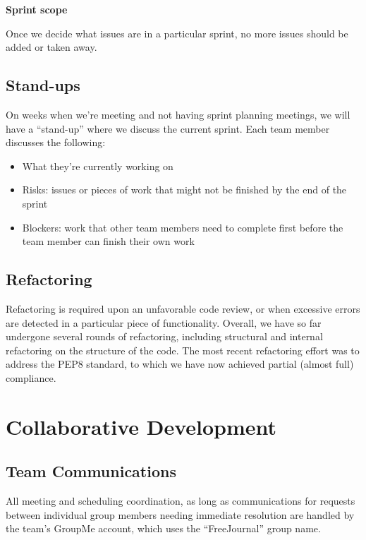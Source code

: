 \documentclass[letterpaper,10pt,oneside]{sphinxmanual}
\begin{document}
\textbf{Sprint scope}

Once we decide what issues are in a particular sprint, no more issues should be added or taken away.


\subsection{Stand-ups}
\label{process:stand-ups}
On weeks when we're meeting and not having sprint planning meetings, we will have a ``stand-up'' where we
discuss the current sprint. Each team member discusses the following:
\begin{itemize}
\item {} 
What they're currently working on

\item {} 
Risks: issues or pieces of work that might not be finished by the end of the sprint

\item {} 
Blockers: work that other team members need to complete first before the team member can finish their own work

\end{itemize}


\subsection{Refactoring}
\label{process:refactoring}
Refactoring is required upon an unfavorable code review, or when excessive errors are detected in a particular
piece of functionality.  Overall, we have so far undergone several rounds of refactoring, including structural
and internal refactoring on the structure of the code.  The most recent refactoring effort was to address the
PEP8 standard, to which we have now achieved partial (almost full) compliance.


\section{Collaborative Development}
\label{process:collaborative-development}

\subsection{Team Communications}
\label{process:team-communications}
All meeting and scheduling coordination, as long as communications for requests between individual group members
needing immediate resolution are handled by the team's GroupMe account, which uses the ``FreeJournal'' group name.
\end{document}
